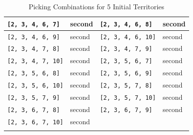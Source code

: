 \begin{longtable}{|p{3.5cm}|p{2.5cm}||p{3.5cm}|p{2.5cm}|}
\texttt{[2, 3, 4, 6, 7]} & \textcolor{CustomBlue}{second} & \texttt{[2, 3, 4, 6, 8]} & \textcolor{CustomBlue}{second} \\ \hline
\texttt{[2, 3, 4, 6, 9]} & \textcolor{CustomBlue}{second} & \texttt{[2, 3, 4, 6, 10]} & \textcolor{CustomBlue}{second} \\ \hline
\texttt{[2, 3, 4, 7, 8]} & \textcolor{CustomBlue}{second} & \texttt{[2, 3, 4, 7, 9]} & \textcolor{CustomBlue}{second} \\ \hline
\texttt{[2, 3, 4, 7, 10]} & \textcolor{CustomBlue}{second} & \texttt{[2, 3, 5, 6, 7]} & \textcolor{CustomBlue}{second} \\ \hline
\texttt{[2, 3, 5, 6, 8]} & \textcolor{CustomBlue}{second} & \texttt{[2, 3, 5, 6, 9]} & \textcolor{CustomBlue}{second} \\ \hline
\texttt{[2, 3, 5, 6, 10]} & \textcolor{CustomBlue}{second} & \texttt{[2, 3, 5, 7, 8]} & \textcolor{CustomBlue}{second} \\ \hline
\texttt{[2, 3, 5, 7, 9]} & \textcolor{CustomBlue}{second} & \texttt{[2, 3, 5, 7, 10]} & \textcolor{CustomBlue}{second} \\ \hline
\texttt{[2, 3, 6, 7, 8]} & \textcolor{CustomBlue}{second} & \texttt{[2, 3, 6, 7, 9]} & \textcolor{CustomBlue}{second} \\ \hline
\texttt{[2, 3, 6, 7, 10]} & \textcolor{CustomBlue}{second} & & \\ \hline

\caption{Picking Combinations for 5 Initial Territories}
\label{tab:5territories}
\end{longtable}

\normalsize

